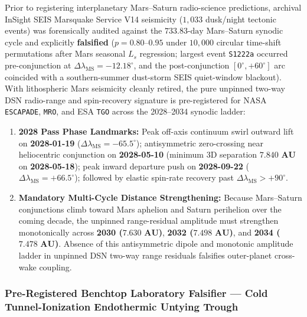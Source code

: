 \documentclass[11pt,a4paper]{article}
\begin{document}
Prior to registering interplanetary Mars--Saturn radio-science predictions, archival InSight SEIS Marsquake Service V14 seismicity ($1{,}033$ dusk/night tectonic events) was forensically audited against the $733.83\text{-day}$ Mars--Saturn synodic cycle and explicitly \textbf{falsified} ($p = 0.80\text{--}0.95$ under $10{,}000$ circular time-shift permutations after Mars seasonal $L_s$ regression; largest event \texttt{S1222a} occurred pre-conjunction at $\Delta\lambda_{\text{MS}} = -12.18^\circ$, and the post-conjunction $[0^\circ, +60^\circ]$ arc coincided with a southern-summer dust-storm SEIS quiet-window blackout). With lithospheric Mars seismicity cleanly retired, the pure unpinned two-way DSN radio-range and spin-recovery signature is pre-registered for NASA \texttt{ESCAPADE}, \texttt{MRO}, and ESA \texttt{TGO} across the 2028--2034 synodic ladder:
\begin{enumerate}
    \item \textbf{2028 Pass Phase Landmarks:} Peak off-axis continuum swirl outward lift on \textbf{2028-01-19} ($\Delta\lambda_{\text{MS}} = -65.5^\circ$); antisymmetric zero-crossing near heliocentric conjunction on \textbf{2028-05-10} (minimum 3D separation $\mathbf{7.840\text{ AU}}$ on \textbf{2028-05-18}); peak inward departure push on \textbf{2028-09-22} ($\Delta\lambda_{\text{MS}} = +66.5^\circ$); followed by elastic spin-rate recovery past $\Delta\lambda_{\text{MS}} > +90^\circ$.
    \item \textbf{Mandatory Multi-Cycle Distance Strengthening:} Because Mars--Saturn conjunctions climb toward Mars aphelion and Saturn perihelion over the coming decade, the unpinned range-residual amplitude must strengthen monotonically across \textbf{2030 ($\mathbf{7.630\text{ AU}}$)}, \textbf{2032 ($\mathbf{7.498\text{ AU}}$)}, and \textbf{2034 ($\mathbf{7.478\text{ AU}}$)}. Absence of this antisymmetric dipole and monotonic amplitude ladder in unpinned DSN two-way range residuals falsifies outer-planet cross-wake coupling.
\end{enumerate}

\subsubsection{Pre-Registered Benchtop Laboratory Falsifier --- Cold Tunnel-Ionization Endothermic Untying Trough}
\label{subsubsec:benchtop_untying_prereg}
\end{document}
